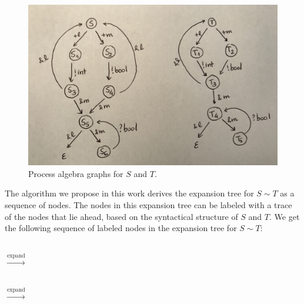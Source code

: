 \begin{example}
	\begin{figure}[h!]
		\includegraphics[width=\columnwidth]{PAgraphsST.jpg}
		\caption{Process algebra graphs for $S$ and $T$.}
			\label{fig:PAgraphsST}
	\end{figure}
	The algorithm we propose in this work derives the expansion tree for $S\sim T$ as a sequence of nodes. The nodes in this expansion tree can be labeled with a trace of the nodes that lie ahead, based on the syntactical structure of $S$ and $T$. We get the following sequence of labeled nodes in the expansion tree for $S\sim T$:\\\\
$\xrightarrow{\text{expand}}$\\\\
$\xrightarrow{\text{expand}}$ \\\\


\end{example}
